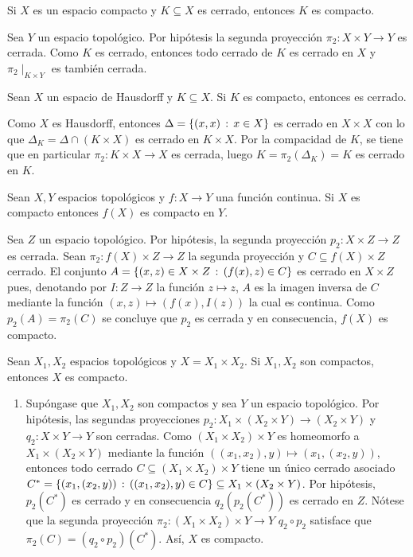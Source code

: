 \begin{Teo}
  Si $X$ es un espacio compacto y $K\subseteq X$ es cerrado,
  entonces $K$ es compacto.
\end{Teo}
\begin{Demo}
  Sea $Y$ un espacio topológico. Por hipótesis la segunda proyección
  $\pi_2:X\times Y\longrightarrow Y$  es cerrada. Como $K$ es cerrado,
  entonces todo cerrado de $K$ es cerrado en $X$ y $\pi_2\mid_{K\times Y}$
  es también cerrada.
\end{Demo}
\begin{Teo}
  Sean $X$ un espacio de Hausdorff y $K\subseteq X$. Si $K$ es compacto,
  entonces es cerrado.
\end{Teo}
\begin{Demo}
  Como $X$ es Hausdorff, entonces $\Delta=\left\{(x,x)\,:\,x\in X\right\}$ es cerrado en $X\times X$
  con lo que $\Delta_K=\Delta\cap(K\times X)$ es cerrado en $K\times X$. Por la compacidad
  de $K$, se tiene que en particular $\pi_2:K\times X\longrightarrow X$ es cerrada, luego
  $K=\pi_2(\Delta_K)=K$ es cerrado en $K$.
\end{Demo}
\begin{Teo}
  Sean $X,Y$ espacios topológicos y $f:X\longrightarrow Y$ una función continua.
  Si $X$ es compacto entonces $f(X)$ es compacto en $Y$.
\end{Teo}
\begin{Demo}
  Sea $Z$ un espacio topológico. Por hipótesis, la segunda proyección
  $p_2:X\times Z\longrightarrow Z$ es cerrada. Sean $\pi_2:f(X)\times Z\longrightarrow Z$
  la segunda proyección y $C\subseteq f(X)\times Z$ cerrado. El conjunto
  $A=\left\{(x,z)\in X\times Z\,:\,(f(x),z)\in C\right\}$ es cerrado en $X\times Z$ pues,
  denotando por $I:Z\longrightarrow Z$ la función $z\longmapsto z$,
  $A$ es la imagen inversa de $C$ mediante la función $(x,z)\longmapsto(f(x),I(z))$ la cual
  es continua. Como $p_2(A)=\pi_2(C)$ se concluye que $p_2$ es cerrada y en consecuencia,
  $f(X)$ es compacto.
\end{Demo}
\begin{Teo}
  Sean $X_1,X_2$ espacios topológicos y $X=X_1\times X_2$. Si $X_1,X_2$
  son compactos, entonces $X$ es compacto.
\end{Teo}
\begin{Demo}
\begin{enumerate}
  \item Supóngase que $X_1,X_2$ son compactos y sea $Y$ un espacio topológico.
  Por hipótesis, las segundas proyecciones $p_2:X_1\times(X_2\times Y)\longrightarrow(X_2\times Y)$
  y $q_2:X\times Y\longrightarrow Y$ son cerradas. Como $(X_1\times X_2)\times Y$
  es homeomorfo a $X_1\times(X_2\times Y)$ mediante la función
  $((x_1,x_2),y)\longmapsto(x_1,(x_2,y))$, entonces todo cerrado $C\subseteq(X_1\times X_2)\times Y$
  tiene un único cerrado asociado 
  $C^*=\left\{(x_1,(x_2,y))\,:\,((x_1,x_2),y)\in C\right\}\subseteq X_1\times(X_2\times Y)$. 
  Por hipótesis, $p_2(C^*)$ es cerrado y en consecuencia $q_2(p_2(C^*))$ es cerrado
  en $Z$. Nótese que la segunda proyección
  $\pi_2:(X_1\times X_2)\times Y\longrightarrow Y$ $q_2\circ p_2$ satisface que
  $\pi_2(C)=(q_2\circ p_2)(C^*)$. Así, $X$ es compacto.
\end{enumerate}
\end{Demo}
